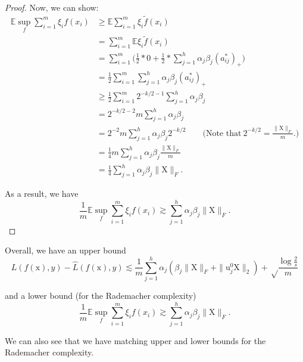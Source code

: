 \documentclass[twoside]{article}
\theoremstyle{definition}
\theoremstyle{definition}
\theoremstyle{remark}
\begin{document}
\begin{proof}
Now, we can show:
\[
\begin{aligned}
\mathbb{E} \sup \limits_f \sum\limits_{i=1}^m \xi_i f(x_i) &\geq \mathbb{E} \sum \limits_{i=1}^m \xi_i \tilde{f}(x_i) \\
&= \sum \limits_{i=1}^m \mathbb{E} \xi_i \tilde{f}(x_i) \\
&= \sum \limits_{i=1}^m \bigg( \frac{1}{2}*0 + \frac{1}{2} * \sum \limits_{j=1}^h \alpha_j \beta_j (a_{ij}^*)_+ \bigg) \\
&= \frac{1}{2} \sum \limits_{i=1}^m \sum \limits_{j=1}^h \alpha_j \beta_j (a_{ij}^*)_+ \\
&\geq \frac{1}{2} \sum \limits_{i=1}^m 2^{-k/2 - 1} \sum \limits_{j=1}^h \alpha_j \beta_j \\
&= 2^{-k/2-2} m \sum \limits_{j=1}^h \alpha_j \beta_j \\
&= 2^{-2} m \sum \limits_{j=1}^h \alpha_j \beta_j 2^{-k/2} \qquad \text{(Note that} \ 2^{-k/2} = \frac{\| \text{X} \|_F}{m}.) \\
&= \frac{1}{4} m \sum \limits_{j=1}^h \alpha_j \beta_j \frac{\| \text{X} \|_F}{m} \\
&= \frac{1}{4} \sum \limits_{j=1}^h \alpha_j \beta_j \| \text{X} \|_F.
\end{aligned}
\]

As a result, we have
\[
\frac{1}{m} \mathbb{E} \sup \limits_f \sum\limits_{i=1}^m \xi_i f(x_i) \gtrsim \sum\limits_{j=1}^h \alpha_j \beta_j \| \text{X} \|_F.
\]

\end{proof}

Overall, we have an upper bound
\[
L(f(\text{x}),y) - \hat L(f(\text{x}),y) \lesssim \frac{1}{m} \sum\limits_{j=1}^h \alpha_j (\beta_j \| \text{X} \|_F + \| \text{u}_j^0 \text{X} \|_2) + \sqrt\frac{\log \frac{2}{s}}{m}
\]

and a lower bound (for the Rademacher complexity)
\[
\frac{1}{m} \mathbb{E} \sup \limits_f \sum\limits_{i=1}^m \xi_i f(x_i) \gtrsim \sum\limits_{j=1}^h \alpha_j \beta_j \| \text{X} \|_F.
\]

We can also see that we have matching upper and lower bounds for the Rademacher complexity.

\nocite{*}


\end{document}
